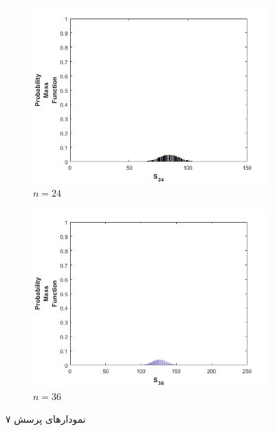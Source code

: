 \documentclass[11pt]{article}
\theoremstyle{definition}
\theoremstyle{lemma}
\theoremstyle{remark}
\begin{document}
\begin{figure}[h!]
		\begin{subfigure}[h!]{0.48\textwidth}
			\includegraphics[width=\textwidth]{./Images/7/24.png}
			\caption{ $n=24$ }
		\end{subfigure}
		\quad
		\begin{subfigure}[h!]{0.48\textwidth}
			\includegraphics[width=\textwidth]{./Images/7/36.png}
			\caption{ $n=36$ }
		\end{subfigure}
		\caption{نمودار‌های پرسش ۷}
		\label{q7}
	\end{figure}
\end{document}
